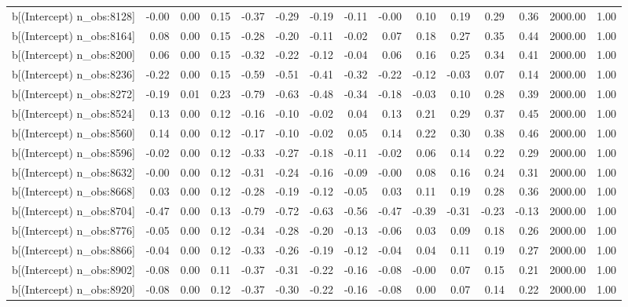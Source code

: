 \begin{table}[ht]
\begin{tabular}{rrrrrrrrrrrrrrr}
  b[(Intercept) n\_obs:8128] & -0.00 & 0.00 & 0.15 & -0.37 & -0.29 & -0.19 & -0.11 & -0.00 & 0.10 & 0.19 & 0.29 & 0.36 & 2000.00 & 1.00 \\ 
  b[(Intercept) n\_obs:8164] & 0.08 & 0.00 & 0.15 & -0.28 & -0.20 & -0.11 & -0.02 & 0.07 & 0.18 & 0.27 & 0.35 & 0.44 & 2000.00 & 1.00 \\ 
  b[(Intercept) n\_obs:8200] & 0.06 & 0.00 & 0.15 & -0.32 & -0.22 & -0.12 & -0.04 & 0.06 & 0.16 & 0.25 & 0.34 & 0.41 & 2000.00 & 1.00 \\ 
  b[(Intercept) n\_obs:8236] & -0.22 & 0.00 & 0.15 & -0.59 & -0.51 & -0.41 & -0.32 & -0.22 & -0.12 & -0.03 & 0.07 & 0.14 & 2000.00 & 1.00 \\ 
  b[(Intercept) n\_obs:8272] & -0.19 & 0.01 & 0.23 & -0.79 & -0.63 & -0.48 & -0.34 & -0.18 & -0.03 & 0.10 & 0.28 & 0.39 & 2000.00 & 1.00 \\ 
  b[(Intercept) n\_obs:8524] & 0.13 & 0.00 & 0.12 & -0.16 & -0.10 & -0.02 & 0.04 & 0.13 & 0.21 & 0.29 & 0.37 & 0.45 & 2000.00 & 1.00 \\ 
  b[(Intercept) n\_obs:8560] & 0.14 & 0.00 & 0.12 & -0.17 & -0.10 & -0.02 & 0.05 & 0.14 & 0.22 & 0.30 & 0.38 & 0.46 & 2000.00 & 1.00 \\ 
  b[(Intercept) n\_obs:8596] & -0.02 & 0.00 & 0.12 & -0.33 & -0.27 & -0.18 & -0.11 & -0.02 & 0.06 & 0.14 & 0.22 & 0.29 & 2000.00 & 1.00 \\ 
  b[(Intercept) n\_obs:8632] & -0.00 & 0.00 & 0.12 & -0.31 & -0.24 & -0.16 & -0.09 & -0.00 & 0.08 & 0.16 & 0.24 & 0.31 & 2000.00 & 1.00 \\ 
  b[(Intercept) n\_obs:8668] & 0.03 & 0.00 & 0.12 & -0.28 & -0.19 & -0.12 & -0.05 & 0.03 & 0.11 & 0.19 & 0.28 & 0.36 & 2000.00 & 1.00 \\ 
  b[(Intercept) n\_obs:8704] & -0.47 & 0.00 & 0.13 & -0.79 & -0.72 & -0.63 & -0.56 & -0.47 & -0.39 & -0.31 & -0.23 & -0.13 & 2000.00 & 1.00 \\ 
  b[(Intercept) n\_obs:8776] & -0.05 & 0.00 & 0.12 & -0.34 & -0.28 & -0.20 & -0.13 & -0.06 & 0.03 & 0.09 & 0.18 & 0.26 & 2000.00 & 1.00 \\ 
  b[(Intercept) n\_obs:8866] & -0.04 & 0.00 & 0.12 & -0.33 & -0.26 & -0.19 & -0.12 & -0.04 & 0.04 & 0.11 & 0.19 & 0.27 & 2000.00 & 1.00 \\ 
  b[(Intercept) n\_obs:8902] & -0.08 & 0.00 & 0.11 & -0.37 & -0.31 & -0.22 & -0.16 & -0.08 & -0.00 & 0.07 & 0.15 & 0.21 & 2000.00 & 1.00 \\ 
  b[(Intercept) n\_obs:8920] & -0.08 & 0.00 & 0.12 & -0.37 & -0.30 & -0.22 & -0.16 & -0.08 & 0.00 & 0.07 & 0.14 & 0.22 & 2000.00 & 1.00 \\ 

\end{tabular}
\end{table}
